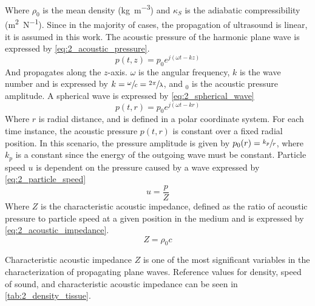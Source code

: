 Where $\rho_{0}$ is the mean density (\unit{\kilogram\per\meter\cubed}) and $\kappa_{S}$ is the \gls{adiabatic} compressibility (\unit{\meter\squared\per\newton}). Since in the majority of cases, the propagation of ultrasound is linear, it is assumed in this work. The acoustic pressure of the harmonic plane wave is expressed by \cref{eq:2_acoustic_pressure}. \raggedbottom
\begin{equation} \label{eq:2_acoustic_pressure}
	p(t,z)=p_{0} e^{j(\omega t - k z)}
\end{equation}
And propagates along the $z$-axis. $\omega$ is the angular frequency, $k$ is the wave number and is expressed by $k=\sfrac{\omega}{c}=\sfrac{2\pi}{\lambda}$, and $_{0}$ is the acoustic pressure amplitude. A spherical wave is expressed by \cref{eq:2_spherical_wave}
\begin{equation} \label{eq:2_spherical_wave}
	p(t,r)=p_{0} e^{j(\omega t - k r)}
\end{equation}
Where $r$ is radial distance, and is defined in a polar coordinate system. For each time instance, the acoustic pressure $p(t,r)$ is constant over a fixed radial position. In this scenario, the pressure amplitude is given by $p_{0}(r) = \sfrac{k_{p}}{r}$, where $k_{p}$ is a constant since the energy of the outgoing wave must be constant.  Particle speed $u$ is dependent on the pressure caused by a wave expressed by \cref{eq:2_particle_speed}
\begin{equation} \label{eq:2_particle_speed}
	u = \frac{p}{Z}
\end{equation}
Where $Z$ is the characteristic acoustic impedance, defined as the ratio of acoustic pressure to particle speed at a given position in the medium and is expressed by \cref{eq:2_acoustic_impedance}.
\begin{equation} \label{eq:2_acoustic_impedance}
	Z = \rho_{0} c
\end{equation}

Characteristic acoustic impedance $Z$ is one of the most significant variables in the characterization of propagating plane waves. Reference values for density, speed of sound, and characteristic acoustic impedance can be seen in \cref{tab:2_density_tissue}.

